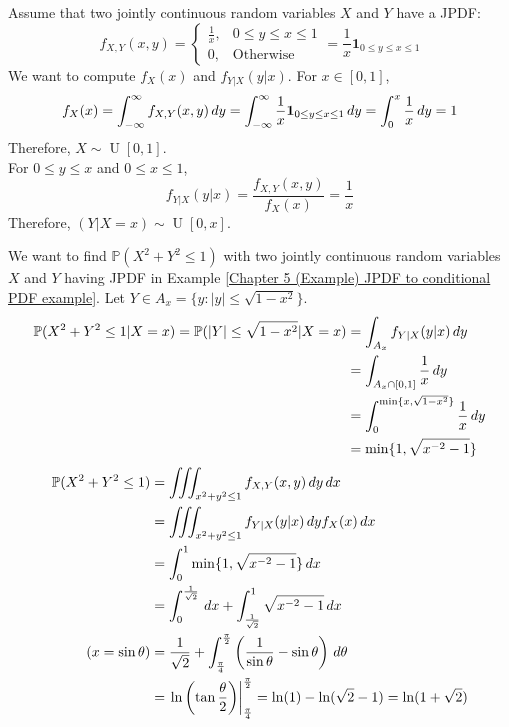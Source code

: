 \documentclass{huhtakm-template-book}
\newcommand{\prob}{\mathbb{P}}
\DeclareMathOperator{\U}{U}
\begin{document}
\newpage
\begin{eg}
	\label{Chapter 5 (Example) JPDF to conditional PDF example}
	Assume that two jointly continuous random variables $X$ and $Y$ have a JPDF:
	\begin{equation*}
		f_{X,Y}(x,y)=\begin{cases}
			\frac{1}{x}, &0\leq y\leq x\leq 1\\
			0, &\text{Otherwise}
		\end{cases}=\frac{1}{x}\mathbf{1}_{0\leq y\leq x\leq 1}
	\end{equation*}
	We want to compute $f_{X}(x)$ and $f_{Y|X}(y|x)$.
	For $x\in [0,1]$,
	\begin{equation*}
		f_{X}(x)=\int_{-\infty}^{\infty} f_{X,Y}(x,y)\,dy=\int_{-\infty}^{\infty}\frac{1}{x}\mathbf{1}_{0\leq y\leq x\leq 1}\,dy=\int_{0}^{x}\frac{1}{x}\,dy=1
	\end{equation*}
	Therefore, $X\sim\U[0,1]$.\\
	For $0\leq y\leq x$ and $0\leq x\leq 1$,
	\begin{equation*}
		f_{Y|X}(y|x)=\frac{f_{X,Y}(x,y)}{f_{X}(x)}=\frac{1}{x}
	\end{equation*}
	Therefore, $(Y|X=x)\sim\U[0,x]$.
\end{eg}
\begin{eg}
	We want to find $\prob(X^{2}+Y^{2}\leq 1)$ with two jointly continuous random variables $X$ and $Y$ having JPDF in Example \ref{Chapter 5 (Example) JPDF to conditional PDF example}. Let $Y\in A_{x}=\{y:|y|\leq\sqrt{1-x^{2}}\}$.
	\begin{align*}
		\prob(X^{2}+Y^{2}\leq 1|X=x)=\prob(|Y|\leq\sqrt{1-x^{2}}|X=x)&=\int_{A_{x}}f_{Y|X}(y|x)\,dy\\
		&=\int_{A_{x}\cap[0,1]}\frac{1}{x}\,dy\\
		&=\intlu{0}{\min\{x,\sqrt{1-x^{2}}\}}\frac{1}{x}\,dy\\
		&=\min\{1,\sqrt{x^{-2}-1}\}
	\end{align*}
	\begin{align*}
		\prob(X^{2}+Y^{2}\leq 1)&=\iiint_{x^{2}+y^{2}\leq 1}f_{X,Y}(x,y)\,dy\,dx\\
		&=\iiint_{x^{2}+y^{2}\leq 1}f_{Y|X}(y|x)\,dy f_{X}(x)\,dx\\
		&=\intlu{0}{1}\min\{1,\sqrt{x^{-2}-1}\}\,dx\\
		&=\intlu{0}{\frac{1}{\sqrt{2}}}\,dx+\intlu{\frac{1}{\sqrt{2}}}{1}\sqrt{x^{-2}-1}\,dx\\
		\tag{$x=\sin\theta$}
		&=\frac{1}{\sqrt{2}}+\intlu{\frac{\pi}{4}}{\frac{\pi}{2}}\left(\frac{1}{\sin\theta}-\sin\theta\right)\,d\theta\\
		&=\left.\ln\left(\tan\frac{\theta}{2}\right)\right|_{\frac{\pi}{4}}^{\frac{\pi}{2}}=\ln(1)-\ln(\sqrt{2}-1)=\ln(1+\sqrt{2})
	\end{align*}
\end{eg}
\end{document}
